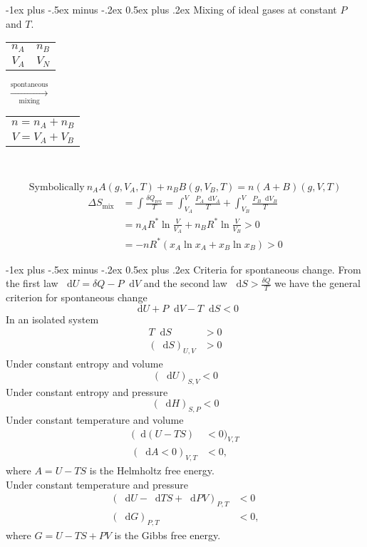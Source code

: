 \documentclass[10pt,landscape,a4paper]{article}
\makeatletter
\renewcommand\d{\mathop{}\!\mathrm{d}}
\renewcommand{\section}{\@startsection{section}{1}{0mm}%
	{-1ex plus -.5ex minus -.2ex}%
	{0.5ex plus .2ex}%
	{\normalfont\large\bfseries}}
\makeatother
\begin{document}
\begin{multicols}{3}
		\section{Mixing of ideal gases at constant $ P $ and $ T $.}
			{\centering\begin{tabular}{| c : c |}\hline$ n_A $ & $ n_B $\\$ V_A $ & $ V_N $\\\hline\end{tabular} $ \ \xrightarrow[\text{mixing}]{\text{spontaneous}} \ $ \begin{tabular}{| c |}\hline $ n=n_A+n_B $\\$ V=V_A+V_B $\\ \hline\end{tabular}\\}
		\[
			\text{Symbolically} \ n_AA(g,V_A,T)+n_BB(g,V_B,T)=n(A+B)(g,V,T)
		\]
			\begin{align*}
				\Delta S_\text{mix}&=\int{\frac{\delta Q_\text{rev}}{T}}=\int_{V_A}^{V}{\frac{P_A\d V_A}{T}}+\int_{V_B}^{V}{\frac{P_B\d V_B}{T}}\\
				&=n_AR^\ast\ln{\frac{V}{V_A}}+n_BR^\ast\ln{\frac{V}{V_B}}>0\\
				&=-nR^\ast(x_A\ln{x_A}+x_B\ln{x_B})>0
			\end{align*}
		
		\section{Criteria for spontaneous change.}
		From the first law $ \d U=\delta Q-P\d V $ and the second law $ \d S>\frac{\delta Q}{T} $ we have the general criterion for spontaneous change
		\[
			\d U+P\d V-T\d S<0
		\] 
		In an isolated system
			\begin{align*}
				T\d S&>0\\
				(\d S)_{U,V}&>0
			\end{align*}
		Under constant entropy and volume
		\[
			(\d U)_{S,V}<0
		\]
		Under constant entropy and pressure
		\[
			(\d H)_{S,P}<0
		\]
		Under constant temperature and volume
			\begin{align*}
				(\d(U-TS)&<0)_{V,T}\\
				(\d A<0)_{V,T}&<0,
			\end{align*}
		where $ A=U-TS $ is the Helmholtz free energy.\\
		Under constant temperature and pressure
			\begin{align*}
				(\d U-\d TS+\d PV)_{P,T}&<0\\
				(\d G)_{P,T}&<0,
			\end{align*}
		where $ G=U-TS+PV $ is the Gibbs free energy.
		

\end{multicols}
\end{document}
